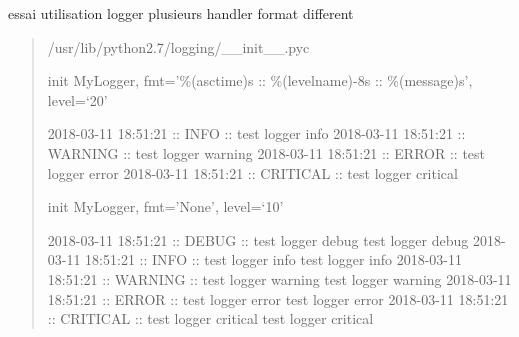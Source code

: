 \documentclass[a4paper,10pt,english]{sphinxmanual}
\begin{document}
essai utilisation logger plusieurs handler format different
\begin{quote}

/usr/lib/python2.7/logging/\_\_init\_\_.pyc

init MyLogger, fmt=’\%(asctime)s :: \%(levelname)-8s :: \%(message)s’, level=‘20’

2018-03-11 18:51:21 :: INFO     :: test logger info
2018-03-11 18:51:21 :: WARNING  :: test logger warning
2018-03-11 18:51:21 :: ERROR    :: test logger error
2018-03-11 18:51:21 :: CRITICAL :: test logger critical

init MyLogger, fmt=’None’, level=‘10’

2018-03-11 18:51:21 :: DEBUG    :: test logger debug
test logger debug
2018-03-11 18:51:21 :: INFO     :: test logger info
test logger info
2018-03-11 18:51:21 :: WARNING  :: test logger warning
test logger warning
2018-03-11 18:51:21 :: ERROR    :: test logger error
test logger error
2018-03-11 18:51:21 :: CRITICAL :: test logger critical
test logger critical
\end{quote}

\begin{fulllineitems}
\label{\detokenize{apidoc_src/src.example:src.example.essai_logging_1.getMyLogger}}
\end{fulllineitems}


\begin{fulllineitems}
\label{\detokenize{apidoc_src/src.example:src.example.essai_logging_1.initMyLogger}}
\end{fulllineitems}


\begin{fulllineitems}
\label{\detokenize{apidoc_src/src.example:src.example.essai_logging_1.testLogger1}}
\end{fulllineitems}
\end{document}
